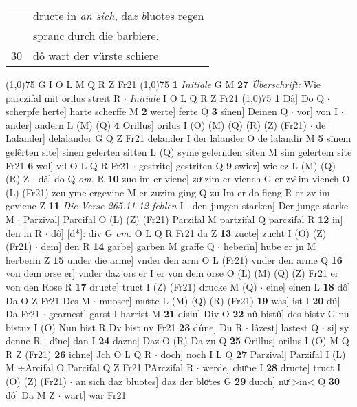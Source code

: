 \documentclass[8pt,a4paper,notitlepage]{article}
\begin{document}
\begin{table}[ht]
\begin{minipage}[t]{0.5\linewidth}
\begin{tabular}{rl}
 & dructe in \textit{an sich}, da\textit{z b}luotes regen\\ 
 & spranc durch die barbiere.\\ 
30 & dô wart der vürste schiere\\ 
\end{tabular}
\scriptsize
\line(1,0){75} \newline
G I O L M Q R Z Fr21 \newline
\line(1,0){75} \newline
\textbf{1} \textit{Initiale} G M  \textbf{27} \textit{Überschrift:} Wie parczifal mit orilus streit R   $\cdot$ \textit{Initiale} I O L Q R Z Fr21  \newline
\line(1,0){75} \newline
\textbf{1} Dâ] Do Q  $\cdot$ scherpfe herte] harte scherffe M \textbf{2} werte] ferte Q \textbf{3} sînen] Deinen Q  $\cdot$ vor] von I  $\cdot$ ander] andern L (M) (Q) \textbf{4} Orillus] orilus I (O) (M) (Q) (R) (Z) (Fr21)  $\cdot$ de Lalander] delalander G Q Z Fr21 delander I der lalander O de lalandir M \textbf{5} sînem gelêrten site] sinen gelerten sitten L (Q) syme gelernden siten M sim gelertem site Fr21 \textbf{6} wol] vil O L Q R Fr21  $\cdot$ gestrite] gestriten Q \textbf{9} swiez] wie ez L (M) (Q) (R) Z  $\cdot$ dâ] do Q \textit{om.} R \textbf{10} zuo im er vienc] zoͮ zim er viench G er zvͦ im viench O (L) (Fr21) zcu yme ergevinc M er zuzim ging Q zu Im er do fieng R er zv im gevienc Z \textbf{11} \textit{Die Verse 265.11-12 fehlen} I   $\cdot$ den jungen starken] Der junge starke M  $\cdot$ Parzival] Parcifal O (L) (Z) (Fr21) Parzifal M partzifal Q parczifal R \textbf{12} in] den in R  $\cdot$ dô] [d*]: div G \textit{om.} O L Q R Fr21 da Z \textbf{13} zucte] zucht I (O) (Z) (Fr21)  $\cdot$ dem] den R \textbf{14} garbe] garben M graffe Q  $\cdot$ heberîn] hube er jn M herberin Z \textbf{15} under die arme] vnder den arm O L (Fr21) vnder den arme Q \textbf{16} von dem orse er] vnder daz ors er I er von dem orse O (L) (M) (Q) (Z) Fr21 er von den Rose R \textbf{17} dructe] truct I (Z) (Fr21) drucke M (Q)  $\cdot$ eine] einen L \textbf{18} dô] Da O Z Fr21 Des M  $\cdot$ muoser] muͯste L (M) (Q) (R) (Fr21) \textbf{19} was] ist I \textbf{20} dû] Da Fr21  $\cdot$ gearnest] garst I harrist M \textbf{21} disiu] Div O \textbf{22} nû bistû] des bistv G nu bistuz I (O) Nun bist R Dv bist nv Fr21 \textbf{23} dûne] Du R  $\cdot$ lâzest] lastest Q  $\cdot$ si] sy denne R  $\cdot$ dîne] dan I \textbf{24} dazne] Daz O (R) Da zu Q \textbf{25} Orillus] orilus I (O) M Q R Z (Fr21) \textbf{26} ichne] Jch O L Q R  $\cdot$ doch] noch I L Q \textbf{27} Parzival] Parzifal I (L) M ÷Arcifal O Parcifal Q Z Fr21 PArczifal R  $\cdot$ werde] chuͤne I \textbf{28} dructe] truct I (O) (Z) (Fr21)  $\cdot$ an sich daz bluotes] daz der bloͮtes G \textbf{29} durch] nuͯ >in< Q \textbf{30} dô] Da M Z  $\cdot$ wart] war Fr21 \newline

\end{minipage}
\end{table}
\end{document}
